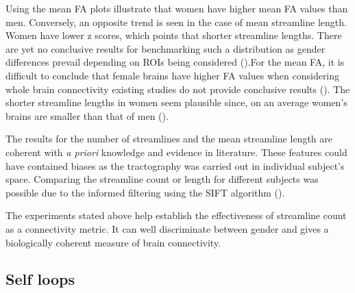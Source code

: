 \documentclass[msthesis.tex]{subfiles}
\begin{document}
Using the mean FA plots illustrate that women have higher mean FA values than men. Conversely, an opposite trend is seen in the case of mean streamline length. Women have lower z scores, which points that shorter streamline lengths. There are yet no conclusive results for benchmarking such a distribution as gender differences prevail depending on ROIs being considered (\cite{kanaan2012gender}).For the mean FA, it is difficult to conclude that female brains have higher FA values when considering whole brain connectivity existing studies do not provide conclusive results (\cite{ingalhalikar2014sex}). The shorter streamline lengths in women seem plausible since, on an average women's brains are smaller than that of men (\cite{ankney1992sex}).

The results for the number of streamlines and the mean streamline length are coherent with \textit{a priori} knowledge and evidence in literature. These features could have contained biases as the tractography was carried out in individual subject's space. Comparing the streamline count or length for different subjects was possible due to the informed filtering using the SIFT algorithm (\cite{yeh2020mapping}).

The experiments stated above help establish the effectiveness of streamline count as a connectivity metric. It can well discriminate between gender and gives a biologically coherent
measure of brain connectivity.

\subsection{Self loops}
\label{res:selfloops}
\end{document}

